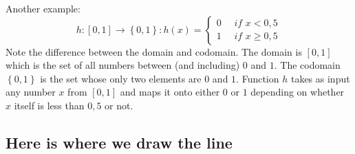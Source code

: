 \noindent Another example:
\begin{equation}
\label{FuncH}
h: \left[ 0,1 \right] \rightarrow \left\{ 0,1 \right\} : h(x) = \left\{
\begin{array}{ll}
 0 \ \ \ \ \ \ \textit{if } x<0,5\\
1 \ \ \ \ \ \ \textit{if } x\geq 0,5
\end{array}
\right.
\end{equation}
Note the difference between the domain and codomain. The domain is $\left[ 0,1 \right]$ which is the set of all numbers between (and including) $0$ and $1$. The codomain $\left\{ 0,1 \right\}$ is the set whose only two elements are $0$ and $1$. Function $h$ takes as input any number $x$ from $\left[ 0,1 \right]$ and maps it onto either $0$ or $1$ depending on whether $x$ itself is less than $0,5$ or not.

\subsection{Here is where we draw the line}

